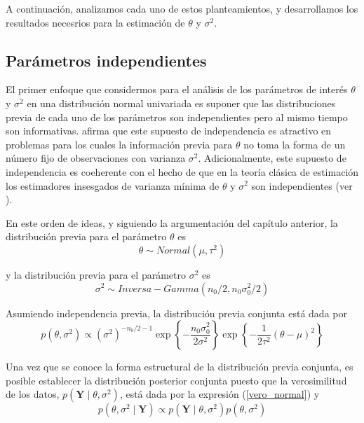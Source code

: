 \documentclass[10pt,openright]{book}\usepackage[]{graphicx}\usepackage[]{color}
\begin{document}
A continuaci\'on, analizamos cada uno de estos planteamientos, y desarrollamos los resultados necesrios para la estimaci\'on de $\theta$ y $\sigma^2$.

\subsection{Par\'ametros independientes}

El primer enfoque que considermos para el an\'alisis de los par\'ametros de inter\'es $\theta$ y $\sigma^2$ en una distribuci\'on normal univariada es suponer que las distribuciones previa de cada uno de los par\'ametros son independientes pero al mismo tiempo son informativas.  afirma que este supuesto de independencia es atractivo en problemas para los cuales la informaci\'on previa para $\theta$ no toma la forma de un n\'umero fijo de observaciones con varianza $\sigma^2$. Adicionalmente, este supuesto de independencia es coeherente con el hecho de que en la teor\'ia cl\'asica de estimaci\'on los estimadores insesgados de varianza m\'inima de $\theta$ y $\sigma^2$ son independientes (ver ).

En este orden de ideas, y siguiendo la argumentaci\'on del cap\'itulo anterior, la distribuci\'on previa para el par\'ametro $\theta$ es
\begin{equation*}
\theta \sim Normal(\mu,\tau^2)
\end{equation*}


y la distribuci\'on previa para el par\'ametro $\sigma^2$ es
\begin{equation*}
\sigma^2 \sim Inversa-Gamma(n_0/2,n_0\sigma^2_0/2)
\end{equation*}

Asumiendo independencia previa, la distribuci\'on previa conjunta est\'a dada por
\begin{equation}
p(\theta,\sigma^2)\propto (\sigma^2)^{-n_0/2-1}\exp\left\{-\dfrac{n_0\sigma^2_0}{2\sigma^2}\right\}
\exp\left\{-\frac{1}{2\tau^2}(\theta-\mu)^2\right\}
\end{equation}

Una vez que se conoce la forma estructural de la distribuci\'on previa conjunta, es posible establecer la distribuci\'on posterior conjunta puesto que la verosimilitud de los datos, $p(\mathbf{Y} \mid \theta,\sigma^2)$, est\'a dada por la expresi\'on (\ref{vero_normal}) y
\begin{equation*}
p(\theta,\sigma^2 \mid \mathbf{Y})\propto p(\mathbf{Y} \mid \theta,\sigma^2)p(\theta,\sigma^2)
\end{equation*}
\end{document}
